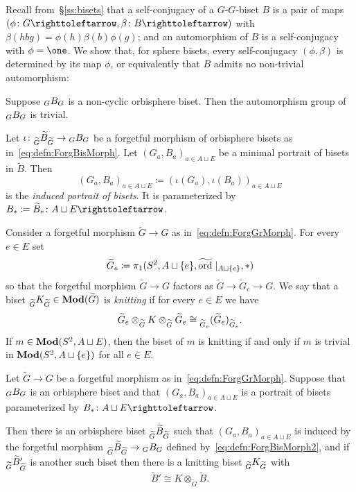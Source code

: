 \documentclass{amsart}
\begin{document}
Recall from~\S\ref{ss:bisets} that a self-conjugacy of a $G$-$G$-biset
$B$ is a pair of maps $(\phi\colon G\selfmap,\beta\colon B\selfmap)$
with $\beta(h b g)=\phi(h)\beta(b)\phi(g)$; and an automorphism of $B$
is a self-conjugacy with $\phi=\one$. We show that, for sphere bisets,
every self-conjugacy $(\phi,\beta)$ is determined by its map $\phi$,
or equivalently that $B$ admits no non-trivial automorphism:
\begin{thm}[No automorphisms]\label{thm:NoGhostAut}
  Suppose $\subscript GB_G$ is a non-cyclic orbisphere biset. Then the
  automorphism group of $\subscript GB_G$ is trivial.
\end{thm}

\begin{defn}\label{defn:forgetting}
  Let $\iota\colon\subscript{\widetilde G}{\widetilde B}_{ \widetilde G}\to
  \subscript G B_G$ be a forgetful morphism of orbisphere bisets as
  in~\eqref{eq:defn:ForgBisMorph}.  Let $(G_a,B_a)_{a\in A\sqcup E}$
  be a minimal portrait of bisets in $\widetilde B$. Then
  \[(G_a,B_a)_{a\in A\sqcup E} \coloneqq
  (\iota(G_{a}),\iota(B_{a}))_{a\in A\sqcup E} \]
  is the \emph{induced portrait of bisets}. It is parameterized by
  $B_*\coloneqq  \widetilde B_* \colon
  A\sqcup E \selfmap$.
\end{defn}

Consider a forgetful morphism $\widetilde G\to G$ as
in~\eqref{eq:defn:ForgGrMorph}.  For every $e\in E$ set \[\widetilde
G_e\coloneqq \pi_1(S^2, A\sqcup\{e\}, \widetilde
{\operatorname{ord}}\mid_{A\sqcup\{e\}},*)
\]
so that the forgetful morphism $\widetilde G\to G$ factors as
$\widetilde G\to\widetilde G_e\to G$.  We say that a biset
$\subscript{\widetilde G}K_{\widetilde G}\in \Mod(\widetilde G)$ is
\emph{knitting} if for every $e\in E$ we have
\[ \widetilde G_e \otimes_{\widetilde G} K \otimes_{\widetilde G}
  \widetilde G_e \cong \subscript{\widetilde G_e}{(\widetilde
    G_e)}_{\widetilde G_e}.
\]
If $m\in \mathbf{\relax Mod}(S^2,A\sqcup E)$, then the biset of $m$ is knitting if
and only if $m$ is trivial in $\mathbf{\relax Mod}(S^2,A\sqcup \{e\})$ for all
$e\in E$.

\begin{thm}
  Let $\widetilde G\to G$ be a forgetful morphism as
  in~\eqref{eq:defn:ForgGrMorph}.  Suppose that $\subscript GB_G$ is an
  orbisphere biset and that $(G_a,B_a)_{a\in A\sqcup E}$ is a portrait
  of bisets parameterized by $B_*\colon A\sqcup E\selfmap$.

  Then there is an orbisphere biset
  $\subscript{\widetilde G}{\widetilde B}_{\widetilde G}$ such that
  $(G_a,B_a)_{a\in A\sqcup E}$ is induced by the forgetful morphism 
  $\subscript{\widetilde G}{\widetilde B}_{\widetilde G}\to
  \subscript GB_G$ defined by~\eqref{eq:defn:ForgBisMorph2},
  and if $\subscript{\widetilde G}{\widetilde B'}_{\widetilde G}$ is another
  such biset then there is a knitting biset
  $\subscript{\widetilde G} K_{\widetilde G}$ with
  \[\widetilde B' \cong K \otimes_{\widetilde G} \widetilde B.\]
\end{thm}
\end{document}
